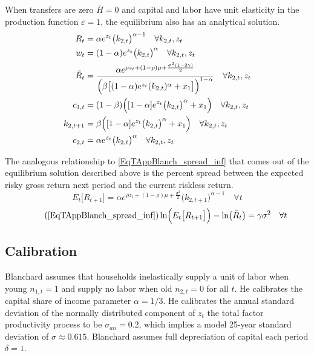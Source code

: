 \documentclass[letterpaper,12pt]{article}
\theoremstyle{definition}
\newcommand\ve{\varepsilon}
\begin{document}
      When transfers are zero $\bar{H}=0$ and capital and labor have unit elasticity in the production function $\ve=1$, the equilibrium also has an analytical solution.
      \begin{align}
        R_t &= \alpha e^{z_t}\bigl(k_{2,t}\bigr)^{\alpha-1} \quad\forall k_{2,t},z_t \label{EqTAppBlanch_EqlRt_1} \\
        w_t &= (1 - \alpha)e^{z_t}\bigl(k_{2,t}\bigr)^\alpha \quad\forall k_{2,t},z_t \label{EqTAppBlahcn_Eqlwt_inf} \\
        \bar{R}_t &= \frac{\alpha e^{\rho z_t + (1-\rho)\mu + \frac{\sigma^2(1-2\gamma)}{2}}}{\Bigl(\beta\bigl[(1-\alpha)e^{z_t}(k_{2,t})^\alpha + x_1\bigr]\Bigr)^{1-\alpha}} \quad\forall k_{2,t},z_t \label{EqTAppBlahcn_EqlRbart_1} \\
        c_{1,t} &= (1 - \beta)\Bigl([1 - \alpha]e^{z_t}\bigl(k_{2,t}\bigr)^\alpha+ x_1\Bigr) \quad\forall k_{2,t},z_t \label{EqTAppBlahcn_Eqlc1t_1} \\
        k_{2,t+1} &= \beta\Bigl([1 - \alpha]e^{z_t}\bigl(k_{2,t}\bigr)^\alpha+ x_1\Bigr) \quad\forall k_{2,t},z_t \label{EqTAppBlahcn_Eqlk2tp1_1} \\
        c_{2,t} &= \alpha e^{z_t}\bigl(k_{2,t}\bigr)^\alpha \quad\forall k_{2,t}, z_t \label{EqTAppBlahcn_Eqlc2t_1}
      \end{align}

      The analogous relationship to \eqref{EqTAppBlanch_spread_inf} that comes out of the equilibrium solution described above is the percent spread between the expected risky gross return next period and the current riskless return.
      \begin{equation}\label{EqTAppBlanch_ERtp1_1}
        E_t\bigl[R_{t+1}\bigr] = \alpha e^{\rho z_t + (1-\rho)\mu + \frac{\sigma^2}{2}}\bigl(k_{2,t+1}\bigr)^{\alpha-1} \quad\forall t
      \end{equation}
      \begin{equation}\tag{\ref{EqTAppBlanch_spread_inf}}
        \ln\Bigl(E_t\bigl[R_{t+1}\bigr]\Bigr) - \ln\bigl(\bar{R}_t\bigr) = \gamma\sigma^2 \quad\forall t
      \end{equation}


  \subsection{Calibration}\label{SecTAppBlanch_Calib}

    Blanchard assumes that households inelastically supply a unit of labor when young $n_{1,t}=1$ and supply no labor when old $n_{2,t}=0$ for all $t$. He calibrates the capital share of income parameter $\alpha=1/3$. He calibrates the annual standard deviation of the normally distributed component of $z_t$ the total factor productivity process to be $\sigma_{an}=0.2$, which implies a model 25-year standard deviation of $\sigma\approx 0.615$. Blanchard assumes full depreciation of capital each period $\delta=1$.
\end{document}
